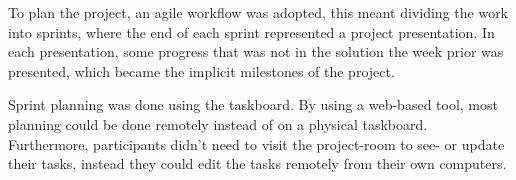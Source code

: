 To plan the project, an agile workflow was adopted, this meant dividing the work into sprints, where the end of each sprint represented a project presentation. In each presentation, some progress that was not in the solution the week prior was presented, which became the implicit milestones of the project.

Sprint planning was done using the \taiga{} taskboard. By using a web-based tool, most planning could be done remotely instead of on a physical taskboard. Furthermore, participants didn't need to visit the project-room to see- or update their tasks, instead they could edit the tasks remotely from their own computers.
